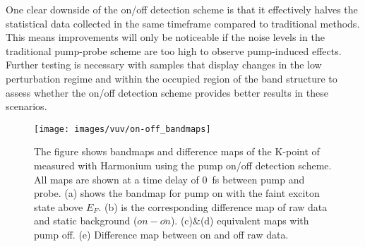 One clear downside of the on/off detection scheme is that it effectively halves the statistical data collected in the same timeframe compared to traditional methods.
This means improvements will only be noticeable if the noise levels in the traditional pump-probe scheme are too high to observe pump-induced effects.
Further testing is necessary with samples that display changes in the low perturbation regime and within the occupied region of the band structure to assess whether the on/off detection scheme provides better results in these scenarios.

\begin{figure}
	\centering
	\texttt{[image: images/vuv/on-off\_bandmaps]}
	\caption{The figure shows bandmaps and difference maps of the K-point of  measured with Harmonium using the pump on/off detection scheme. All maps are shown at a time delay of \qty{0}{\femto\second} between pump and probe.
	(a) shows the bandmap for pump on with the faint exciton state above $E_F$. (b) is the corresponding difference map of raw data and static background ($on-\overline{on}$). (c)\&(d) equivalent maps with pump off. (e) Difference map between on and off raw data.}
	\label{fig:on-offbandmaps}
\end{figure}
